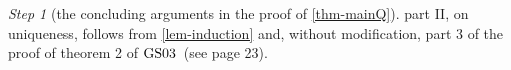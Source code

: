 \documentclass[ecta,nameyear,draft]{econsocart}
\makeatletter
\newcommand{\countof}{\mathbin{\#}\hskip1pt}
\newcommand{\R}{\mathbb R}
\newcommand{\mc}{\mathcal}
\newcommand\mplus{\text{\srcsize$+$}}
\newcommand{\spann}{\operatorname{span}}
\newcommand{\aext}{\mathrel{\acute{\mathrel{\mathcal R}}}}
\newcommand{\mbbt}{{\mathbf {T}}}
\newcommand{\mbbtpp}{{\mathds{T}}}
\newcommand{\mbbj}{\mathbf J}
\newcommand{\mbbjpp}{\mathds{J}}
\newcommand{\xy}{{(x, y)}}
\newcommand{\dd}{{(\cdot,\cdot)}}
\DeclareMathOperator{\ess}{ess}
\newcommand\Wlog{W\@.l\@.o\@.g\@ifnextchar.{}{.\@}}
\newcommand{\srcsize}{\@setfontsize{\srcsize}{3pt}{3pt}}
\newcommand{\gsii}{$\textup{GS03}$}
\theoremstyle{plain}
\theoremstyle{remark}
\newtheorem{step}{Step}[section]
\makeatother
\begin{document}
\begin{appendix}
\begin{step}[the concluding arguments in the proof of \cref{thm-mainQ}]
     part II, on uniqueness, follows from \cref{lem-induction}
    and, without modification, part 3 of the proof of theorem 2 of \gsii\ (see
    page 23).
  \end{step}
  

\end{appendix}
\end{document}
